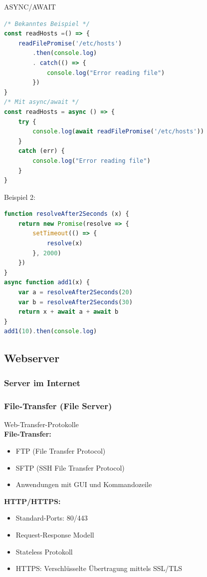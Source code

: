 \begin{code}{ASYNC/AWAIT}
\begin{lstlisting}[language=JavaScript, style=basesmol]
/* Bekanntes Beispiel */
const readHosts =() => {
    readFilePromise('/etc/hosts')
        .then(console.log)
        . catch(() => {
            console.log("Error reading file")
        })
}
/* Mit async/await */
const readHosts = async () => {
    try {
        console.log(await readFilePromise('/etc/hosts'))
    }
    catch (err) {
        console.log("Error reading file")
    }
}
\end{lstlisting}
Beispiel 2:
\begin{lstlisting}[language=JavaScript, style=basesmol]
function resolveAfter2Seconds (x) {
    return new Promise(resolve => {
        setTimeout(() => {
            resolve(x)
        }, 2000)
    })
}
async function add1(x) {
    var a = resolveAfter2Seconds(20)
    var b = resolveAfter2Seconds(30)
    return x + await a + await b
}
add1(10).then(console.log)
\end{lstlisting}
\end{code}


\pagebreak

\subsection{Webserver}

\subsubsection{Server im Internet}

\subsubsection{File-Transfer (File Server)}


\begin{definition}{Web-Transfer-Protokolle}\\
    \textbf{File-Transfer:}
    \begin{itemize}
        \item FTP (File Transfer Protocol)
        \item SFTP (SSH File Transfer Protocol)
        \item Anwendungen mit GUI und Kommandozeile
    \end{itemize}

    \textbf{HTTP/HTTPS:}
    \begin{itemize}
        \item Standard-Ports: 80/443
        \item Request-Response Modell
        \item Stateless Protokoll
        \item HTTPS: Verschlüsselte Übertragung mittels SSL/TLS
    \end{itemize}
\end{definition}

